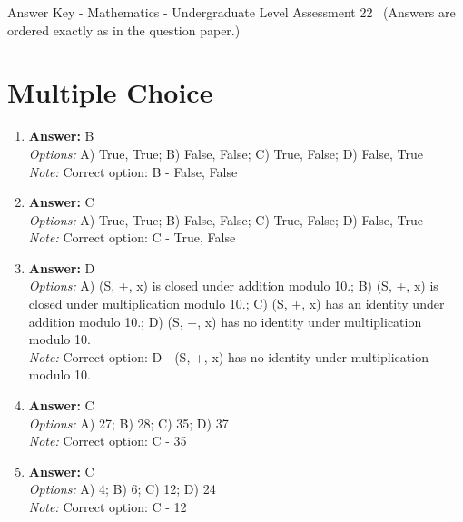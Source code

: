 \documentclass[12pt]{article}
\begin{document}
\begin{center}
Answer Key - Mathematics - Undergraduate Level Assessment 22 \
\small (Answers are ordered exactly as in the question paper.)
\end{center}

\section*{Multiple Choice}
\begin{enumerate}[label=\arabic*.]
\item \textbf{Answer:} B
\\ \textit{Options:} A) True, True; B) False, False; C) True, False; D) False, True
\\ \textit{Note:} Correct option: B - False, False
\item \textbf{Answer:} C
\\ \textit{Options:} A) True, True; B) False, False; C) True, False; D) False, True
\\ \textit{Note:} Correct option: C - True, False
\item \textbf{Answer:} D
\\ \textit{Options:} A) (S, +, x) is closed under addition modulo 10.; B) (S, +, x) is closed under multiplication modulo 10.; C) (S, +, x) has an identity under addition modulo 10.; D) (S, +, x) has no identity under multiplication modulo 10.
\\ \textit{Note:} Correct option: D - (S, +, x) has no identity under multiplication modulo 10.
\item \textbf{Answer:} C
\\ \textit{Options:} A) 27; B) 28; C) 35; D) 37
\\ \textit{Note:} Correct option: C - 35
\item \textbf{Answer:} C
\\ \textit{Options:} A) 4; B) 6; C) 12; D) 24
\\ \textit{Note:} Correct option: C - 12
\end{enumerate}
\end{document}
